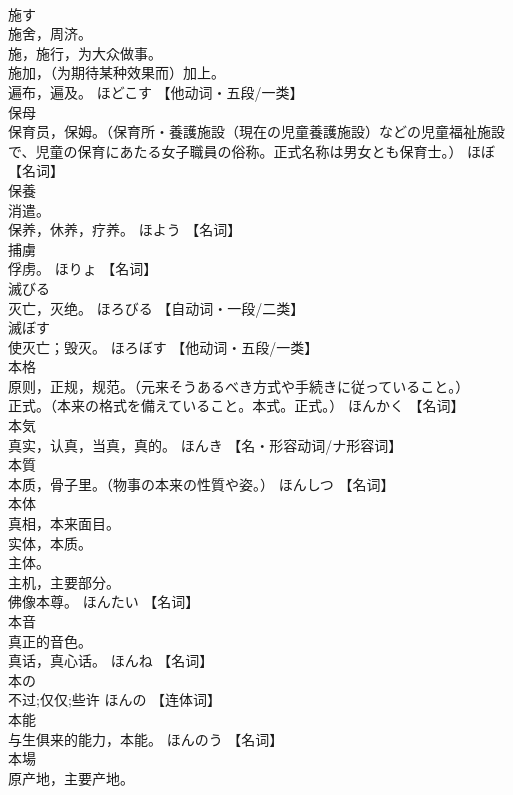 \documentclass[8pt]{extreport}
\begin{document}
\begin{CJK}{UTF8}{min}
\\	施す	
\\	施舍，周济。 
\\	施，施行，为大众做事。 
\\	施加，（为期待某种效果而）加上。 
\\	遍布，遍及。	ほどこす		【他动词・五段/一类】
\\	保母	
\\	保育员，保姆。（保育所・養護施設（現在の児童養護施設）などの児童福祉施設で、児童の保育にあたる女子職員の俗称。正式名称は男女とも保育士。）	ほぼ		【名词】
\\	保養	
\\	消遣。 
\\	保养，休养，疗养。	ほよう		【名词】
\\	捕虜	
\\	俘虏。	ほりょ		【名词】
\\	滅びる	
\\	灭亡，灭绝。	ほろびる		【自动词・一段/二类】
\\	滅ぼす	
\\	使灭亡；毁灭。	ほろぼす		【他动词・五段/一类】
\\	本格	
\\	原则，正规，规范。（元来そうあるべき方式や手続きに従っていること。） 
\\	正式。（本来の格式を備えていること。本式。正式。）	ほんかく		【名词】
\\	本気	
\\	真实，认真，当真，真的。	ほんき		【名・形容动词/ナ形容词】
\\	本質	
\\	本质，骨子里。（物事の本来の性質や姿。）	ほんしつ		【名词】
\\	本体	
\\	真相，本来面目。 
\\	实体，本质。 
\\	主体。 
\\	主机，主要部分。 
\\	佛像本尊。	ほんたい		【名词】
\\	本音	
\\	真正的音色。 
\\	真话，真心话。	ほんね		【名词】
\\	本の	
\\	不过;仅仅;些许	ほんの		【连体词】
\\	本能	
\\	与生俱来的能力，本能。	ほんのう		【名词】
\\	本場	
\\	原产地，主要产地。 

\end{CJK}
\end{document}
